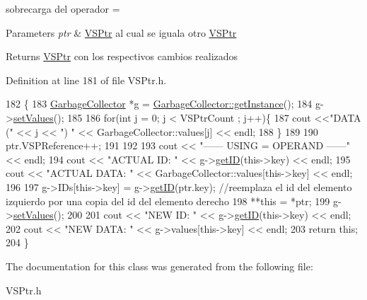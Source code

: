 sobrecarga del operador = 


\begin{DoxyParams}{Parameters}
{\em ptr} & \hyperlink{classVSPtr}{V\+S\+Ptr} al cual se iguala otro \hyperlink{classVSPtr}{V\+S\+Ptr} \\
\hline
\end{DoxyParams}
\begin{DoxyReturn}{Returns}
\hyperlink{classVSPtr}{V\+S\+Ptr} con los respectivos cambios realizados 
\end{DoxyReturn}


Definition at line 181 of file V\+S\+Ptr.\+h.


\begin{DoxyCode}
182     \{
183         \hyperlink{classGarbageCollector}{GarbageCollector} *g = \hyperlink{classGarbageCollector_ade4bccdf41223cc395b646db3f60ac8b}{GarbageCollector::getInstance}();
184         g->\hyperlink{classGarbageCollector_ab9695e995e50172ba4d4c21a9c17e841}{setValues}();
185 
186         \textcolor{keywordflow}{for}(\textcolor{keywordtype}{int} j = 0; j < VSPtrCount ; j++)\{
187                 cout <<\textcolor{stringliteral}{"DATA ("} << j << \textcolor{stringliteral}{") "} << GarbageCollector::values[j] << endl;
188             \}
189             
190         ptr.VSPReference++;
191 
192 
193         cout << \textcolor{stringliteral}{"------ USING = OPERAND ------"} << endl;
194         cout << \textcolor{stringliteral}{"ACTUAL ID: "} << g->\hyperlink{classGarbageCollector_a6bd32127344dabc3b5af12e8ddabace5}{getID}(this->key) << endl;
195         cout << \textcolor{stringliteral}{"ACTUAL DATA: "} << GarbageCollector::values[this->key] << endl;
196 
197         g->IDs[this->key] = g->\hyperlink{classGarbageCollector_a6bd32127344dabc3b5af12e8ddabace5}{getID}(ptr.key);        \textcolor{comment}{//reemplaza el id del elemento izquierdo por una
       copia del id del elemento derecho}
198         **\textcolor{keyword}{this} = *ptr;
199         g->\hyperlink{classGarbageCollector_ab9695e995e50172ba4d4c21a9c17e841}{setValues}();
200 
201         cout << \textcolor{stringliteral}{"NEW ID: "} << g->\hyperlink{classGarbageCollector_a6bd32127344dabc3b5af12e8ddabace5}{getID}(this->key) << endl;
202         cout << \textcolor{stringliteral}{"NEW DATA: "} << g->values[this->key] << endl;
203         \textcolor{keywordflow}{return} \textcolor{keyword}{this};
204     \}
\end{DoxyCode}


The documentation for this class was generated from the following file\+:\begin{DoxyCompactItemize}
\item 
V\+S\+Ptr.\+h\end{DoxyCompactItemize}
